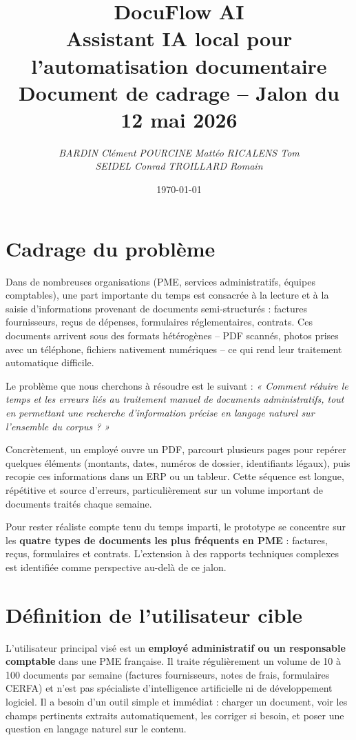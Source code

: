 \documentclass[11pt,a4paper]{article}
\title{%
  \textbf{DocuFlow AI}\\
  Assistant IA local pour l'automatisation documentaire\\[0.5em]
  \large Document de cadrage -- Jalon du 12 mai 2026
}
\author{%
  \textit{BARDIN Clément} \quad
  \textit{POURCINE Mattéo} \quad
  \textit{RICALENS Tom}\\[0.3em]
  \textit{SEIDEL Conrad} \quad
  \textit{TROILLARD Romain}%
}
\date{\today}
\begin{document}
\maketitle

\section{Cadrage du problème}

Dans de nombreuses organisations (PME, services administratifs, équipes comptables), une part importante du temps est consacrée à la lecture et à la saisie d'informations provenant de documents semi-structurés : factures fournisseurs, reçus de dépenses, formulaires réglementaires, contrats. Ces documents arrivent sous des formats hétérogènes -- PDF scannés, photos prises avec un téléphone, fichiers nativement numériques -- ce qui rend leur traitement automatique difficile.

Le problème que nous cherchons à résoudre est le suivant : \textit{« Comment réduire le temps et les erreurs liés au traitement manuel de documents administratifs, tout en permettant une recherche d'information précise en langage naturel sur l'ensemble du corpus ? »}

Concrètement, un employé ouvre un PDF, parcourt plusieurs pages pour repérer quelques éléments (montants, dates, numéros de dossier, identifiants légaux), puis recopie ces informations dans un ERP ou un tableur. Cette séquence est longue, répétitive et source d'erreurs, particulièrement sur un volume important de documents traités chaque semaine.

Pour rester réaliste compte tenu du temps imparti, le prototype se concentre sur les \textbf{quatre types de documents les plus fréquents en PME} : factures, reçus, formulaires et contrats. L'extension à des rapports techniques complexes est identifiée comme perspective au-delà de ce jalon.

\section{Définition de l'utilisateur cible}

L'utilisateur principal visé est un \textbf{employé administratif ou un responsable comptable} dans une PME française. Il traite régulièrement un volume de 10 à 100 documents par semaine (factures fournisseurs, notes de frais, formulaires CERFA) et n'est pas spécialiste d'intelligence artificielle ni de développement logiciel. Il a besoin d'un outil simple et immédiat : charger un document, voir les champs pertinents extraits automatiquement, les corriger si besoin, et poser une question en langage naturel sur le contenu.
\end{document}
